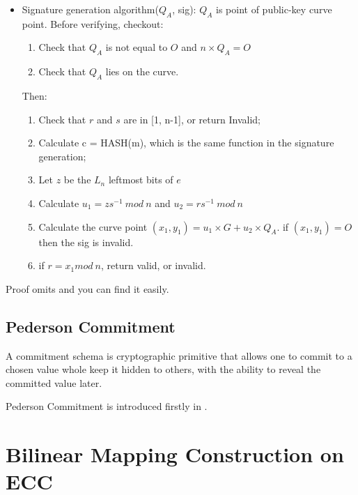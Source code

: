 \documentclass[a4paper,11pt]{article}
\begin{document}
\begin{itemize}
\item Signature generation algorithm($Q_A$, sig):  $Q_A$ is point of public-key curve point.
Before verifying, checkout: 
\begin{enumerate}
\item Check that $Q_A$ is not equal to $O$ and $n \times Q_A = O$
\item Check that $Q_A$ lies on the curve.
\end{enumerate}

Then:
\begin{enumerate}
\item Check that $r$ and $s$ are in [1, n-1], or return Invalid;
\item Calculate c = HASH(m), which is the same function in the signature generation;
\item Let $z$ be the $L_n$ leftmost bits of $e$
\item Calculate $u_1 = zs^{-1}\ mod\ n$  and $u_2 = rs^{-1}\ mod\ n$
\item Calculate the curve point $(x_1, y_1) =  u_1 \times G + u_2 \times Q_A$. if $(x_1, y_1) = O$ then the sig is invalid.
\item if $ r = x_1 mod\ n$, return valid, or invalid.
\end{enumerate}

\end{itemize}
Proof omits and you can find it easily. 

\subsection{Pederson Commitment}

A commitment schema is cryptographic primitive that allows one to commit to a chosen value whole keep it hidden to others, with the ability to reveal the committed value later.

Pederson Commitment is introduced firstly in \cite{pedersen1991non}.

\section{Bilinear Mapping Construction on ECC}





\end{document}
